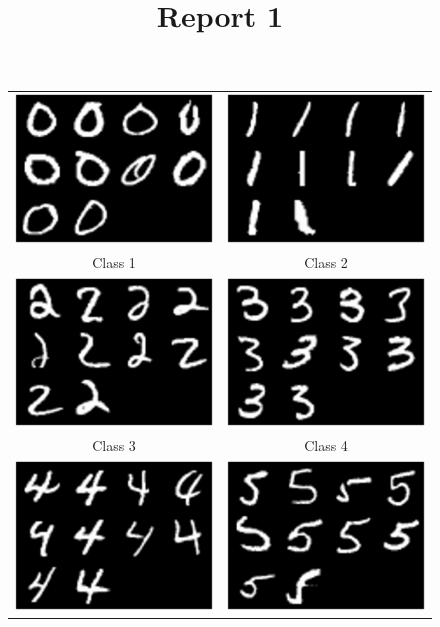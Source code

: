 \documentclass{article}
\title{Report 1}
\begin{document}
\begin{figure}
\centering
\begin{tabular}{cc}
\includegraphics[width=55mm]{task1_1_imgs_class1.eps} &   \includegraphics[width=55mm]{task1_1_imgs_class2.eps} \\
Class 1 & Class 2 \\[6pt]
 \includegraphics[width=55mm]{task1_1_imgs_class3.eps} &   \includegraphics[width=55mm]{task1_1_imgs_class4.eps} \\
     Class 3 & Class 4 \\[6pt]
\includegraphics[width=55mm]{task1_1_imgs_class5.eps} &   \includegraphics[width=55mm]{task1_1_imgs_class6.eps} \\

\end{tabular}
\end{figure}
\end{document}
